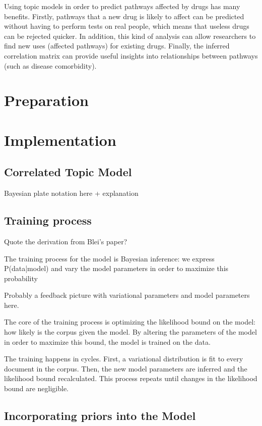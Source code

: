 \documentclass[12pt,a4paper,twoside,openright]{report}
\begin{document}
Using topic models in order to predict pathways affected by drugs has many benefits. Firstly, pathways that a new drug is likely to affect can be predicted without having to perform tests on real people, which means that useless drugs can be rejected quicker. In addition, this kind of analysis can allow researchers to find new uses (affected pathways) for existing drugs. Finally, the inferred correlation matrix can provide useful insights into relationships between pathways (such as disease comorbidity).

\chapter{Preparation}

\chapter{Implementation}

\section{Correlated Topic Model}

Bayesian plate notation here + explanation

\section{Training process}

Quote the derivation from Blei's paper?

The training process for the model is Bayesian inference: we express P(data|model) and vary the model parameters in order to maximize this probability

Probably a feedback picture with variational parameters and model parameters here.


The core of the training process is optimizing the likelihood bound on the model: how likely is the corpus given the model. By altering the parameters of the model in order to maximize this bound, the model is trained on the data.

The training happens in cycles. First, a variational distribution is fit to every document in the corpus. Then, the new model parameters are inferred and the likelihood bound recalculated. This process repeats until changes in the likelihood bound are negligible.

\section{Incorporating priors into the Model}
\end{document}
